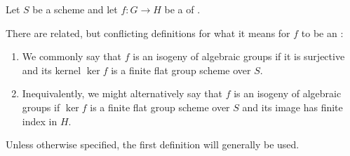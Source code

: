 \begin{definition} \label{definition:isogeny_of_algebraic_group_schemes_over_a_scheme}
    Let $S$ be a scheme and let $f: G \to H$ be a  of . 

    There are related, but conflicting definitions for what it means for $f$ to be an :
    \begin{enumerate}
        \item We commonly say that $f$ is an isogeny of algebraic groups if it is surjective and its kernel $\ker f$ is a finite flat group scheme over $S$.
        \item Inequivalently, we might alternatively say that $f$ is an isogeny of algebraic groups if $\ker f$ is a finite flat group scheme over $S$ and its image has finite index in $H$.
    \end{enumerate}
    Unless otherwise specified, the first definition will generally be used.
\end{definition}
